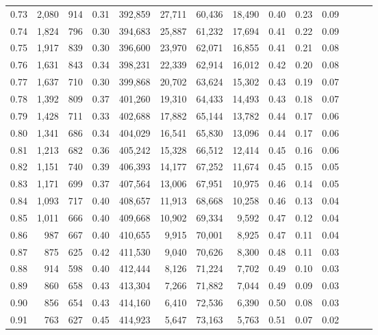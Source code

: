 \begin{tabular}{rrrrrrrrrrrrrr}
0.73 &  2,080 &    914 &  0.31 &  392,859 &   27,711 &  60,436 &  18,490 &  0.40 &  0.23 &      0.09 \\
0.74 &  1,824 &    796 &  0.30 &  394,683 &   25,887 &  61,232 &  17,694 &  0.41 &  0.22 &      0.09 \\
0.75 &  1,917 &    839 &  0.30 &  396,600 &   23,970 &  62,071 &  16,855 &  0.41 &  0.21 &      0.08 \\
0.76 &  1,631 &    843 &  0.34 &  398,231 &   22,339 &  62,914 &  16,012 &  0.42 &  0.20 &      0.08 \\
0.77 &  1,637 &    710 &  0.30 &  399,868 &   20,702 &  63,624 &  15,302 &  0.43 &  0.19 &      0.07 \\
0.78 &  1,392 &    809 &  0.37 &  401,260 &   19,310 &  64,433 &  14,493 &  0.43 &  0.18 &      0.07 \\
0.79 &  1,428 &    711 &  0.33 &  402,688 &   17,882 &  65,144 &  13,782 &  0.44 &  0.17 &      0.06 \\
0.80 &  1,341 &    686 &  0.34 &  404,029 &   16,541 &  65,830 &  13,096 &  0.44 &  0.17 &      0.06 \\
0.81 &  1,213 &    682 &  0.36 &  405,242 &   15,328 &  66,512 &  12,414 &  0.45 &  0.16 &      0.06 \\
0.82 &  1,151 &    740 &  0.39 &  406,393 &   14,177 &  67,252 &  11,674 &  0.45 &  0.15 &      0.05 \\
0.83 &  1,171 &    699 &  0.37 &  407,564 &   13,006 &  67,951 &  10,975 &  0.46 &  0.14 &      0.05 \\
0.84 &  1,093 &    717 &  0.40 &  408,657 &   11,913 &  68,668 &  10,258 &  0.46 &  0.13 &      0.04 \\
0.85 &  1,011 &    666 &  0.40 &  409,668 &   10,902 &  69,334 &   9,592 &  0.47 &  0.12 &      0.04 \\
0.86 &    987 &    667 &  0.40 &  410,655 &    9,915 &  70,001 &   8,925 &  0.47 &  0.11 &      0.04 \\
0.87 &    875 &    625 &  0.42 &  411,530 &    9,040 &  70,626 &   8,300 &  0.48 &  0.11 &      0.03 \\
0.88 &    914 &    598 &  0.40 &  412,444 &    8,126 &  71,224 &   7,702 &  0.49 &  0.10 &      0.03 \\
0.89 &    860 &    658 &  0.43 &  413,304 &    7,266 &  71,882 &   7,044 &  0.49 &  0.09 &      0.03 \\
0.90 &    856 &    654 &  0.43 &  414,160 &    6,410 &  72,536 &   6,390 &  0.50 &  0.08 &      0.03 \\
0.91 &    763 &    627 &  0.45 &  414,923 &    5,647 &  73,163 &   5,763 &  0.51 &  0.07 &      0.02 \\

\end{tabular}
